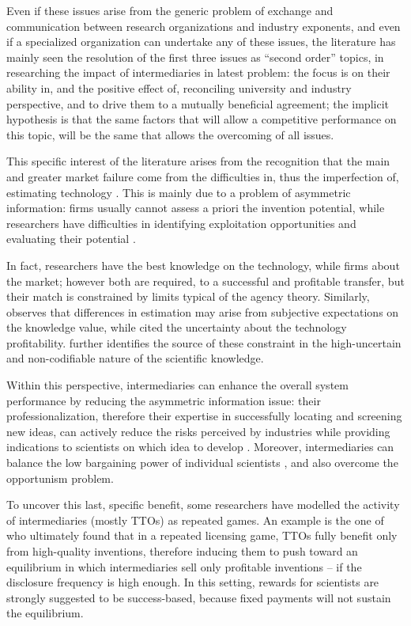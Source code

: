 Even if these issues arise from the generic problem of exchange and communication between research organizations and industry exponents, and even if a specialized organization can undertake any of these issues, the literature has mainly seen the resolution of the first three issues as \enquote{second order} topics, in researching the impact of intermediaries in latest problem: the focus is on their ability in, and the positive effect of, reconciling university and industry perspective, and to drive them to a mutually beneficial agreement; the implicit hypothesis is that the same factors that will allow a competitive performance on this topic, will be the same that allows the overcoming of all issues.

This specific interest of the literature arises from the recognition that the main and greater market failure come from the difficulties in, thus the imperfection of, estimating technology \citep{Hoppe2005}. This is mainly due to a problem of asymmetric information: firms usually cannot assess a priori the invention potential, while researchers have difficulties in identifying exploitation opportunities and evaluating their potential \citep{Debackere2005}. 

In fact, researchers have the best knowledge on the technology, while firms about the market; however both are required, to a successful and profitable transfer, but their match is constrained by limits typical of the agency theory. Similarly, \citet{Bercovitz2006} observes that differences in estimation may arise from subjective expectations on the knowledge value, while \citet{Hoppe2005} cited the uncertainty about the technology profitability. \citet{Debackere2005} further identifies the source of these constraint in the high-uncertain and non-codifiable nature of the scientific knowledge.

Within this perspective, intermediaries can enhance the overall system performance by reducing the asymmetric information issue: their professionalization, therefore their expertise in successfully locating and screening new ideas, can actively reduce the risks perceived by industries while providing indications to scientists on which idea to develop \citep{Debackere2005}. Moreover, intermediaries can balance the low bargaining power of individual scientists \citep{Bercovitz2006}, and also overcome the opportunism problem.

To uncover this last, specific benefit, some researchers have modelled the activity of intermediaries (mostly TTOs) as repeated games. An example is the one of \citet{Hoppe2005} who ultimately found that in a repeated licensing game, TTOs fully benefit only from high-quality inventions, therefore inducing them to push toward an equilibrium in which intermediaries sell only profitable inventions – if the disclosure frequency is high enough. In this setting, rewards for scientists are strongly suggested to be success-based, because fixed payments will not sustain the equilibrium. 

